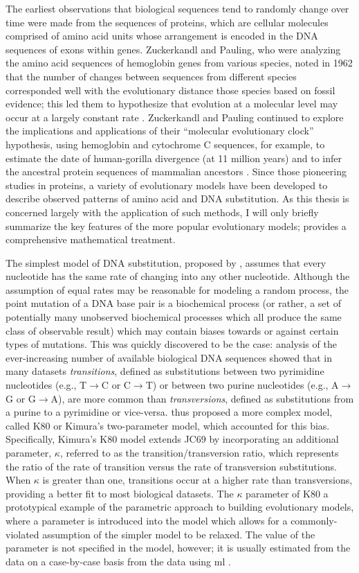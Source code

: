 The earliest observations that biological sequences tend to randomly
change over time were made from the sequences of proteins, which are
cellular molecules comprised of amino acid units whose arrangement is
encoded in the DNA sequences of exons within genes. Zuckerkandl and
Pauling, who were analyzing the amino acid sequences of hemoglobin
genes from various species, noted in 1962 that the number of changes
between sequences from different species corresponded well with the
evolutionary distance those species based on fossil evidence; this led
them to hypothesize that evolution at a molecular level may occur at a
largely constant rate \citep{Zuckerkandl1962,Morgan1998}. Zuckerkandl
and Pauling continued to explore the implications and applications of
their ``molecular evolutionary clock'' hypothesis, using hemoglobin
and cytochrome C sequences, for example, to estimate the date of
human-gorilla divergence (at 11 million years) and to infer the
ancestral protein sequences of mammalian ancestors
\citep{Zuckerkandl1965}. Since those pioneering studies in proteins, a
variety of evolutionary models have been developed to describe
observed patterns of amino acid and DNA substitution. As this thesis
is concerned largely with the application of such methods, I will only
briefly summarize the key features of the more popular evolutionary
models; \citet{Yang2006} provides a comprehensive mathematical
treatment.

The simplest model of DNA substitution, proposed by
\citet{Jukes1969a}, assumes that every nucleotide has the same rate of
changing into any other nucleotide. Although the assumption of equal
rates may be reasonable for modeling a random process, the point
mutation of a DNA base pair is a biochemical process (or rather, a set
of potentially many unobserved biochemical processes which all produce
the same class of observable result) which may contain biases towards
or against certain types of mutations. This was quickly discovered to
be the case: analysis of the ever-increasing number of available
biological DNA sequences showed that in many datasets
\emph{transitions}, defined as substitutions between two pyrimidine
nucleotides (e.g., T$\to$C or C$\to$T) or between two purine
nucleotides (e.g., A$\to$G or G$\to$A), are more common than
\emph{transversions}, defined as substitutions from a purine to a
pyrimidine or vice-versa. \citet{Kimura1980} thus proposed a more
complex model, called K80 or Kimura's two-parameter model, which
accounted for this bias. Specifically, Kimura's K80 model extends JC69
by incorporating an additional parameter, $\kappa$, referred to as the
transition/transversion ratio, which represents the ratio of the rate
of transition versus the rate of transversion substitutions. When
$\kappa$ is greater than one, transitions occur at a higher rate than
transversions, providing a better fit to most biological datasets. The
$\kappa$ parameter of K80 a prototypical example of the parametric
approach to building evolutionary models, where a parameter is
introduced into the model which allows for a commonly-violated
assumption of the simpler model to be relaxed. The value of the
parameter is not specified in the model, however; it is usually
estimated from the data on a case-by-case basis from the data using
\ac{ml} \citep{Whelan2001}.

